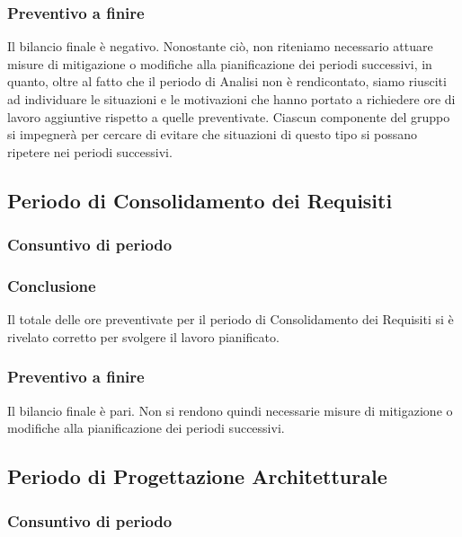 \subsubsection{Preventivo a finire}
Il bilancio finale è negativo. Nonostante ciò, non riteniamo necessario attuare misure di mitigazione o modifiche alla pianificazione dei periodi successivi, in quanto, oltre al fatto che il periodo di Analisi non è rendicontato, siamo riusciti ad individuare le situazioni e le motivazioni che hanno portato a richiedere ore di lavoro aggiuntive rispetto a quelle preventivate. Ciascun componente del gruppo si impegnerà per cercare di evitare che situazioni di questo tipo si possano ripetere nei periodi successivi.


\subsection{Periodo di Consolidamento dei Requisiti}
\subsubsection{Consuntivo di periodo}


\subsubsection{Conclusione}
Il totale delle ore preventivate per il periodo di Consolidamento dei Requisiti si è rivelato corretto per svolgere il lavoro pianificato.
\subsubsection{Preventivo a finire}
Il bilancio finale è pari. Non si rendono quindi necessarie misure di mitigazione o modifiche alla pianificazione dei periodi successivi.

\subsection{Periodo di Progettazione Architetturale}
\subsubsection{Consuntivo di periodo}



